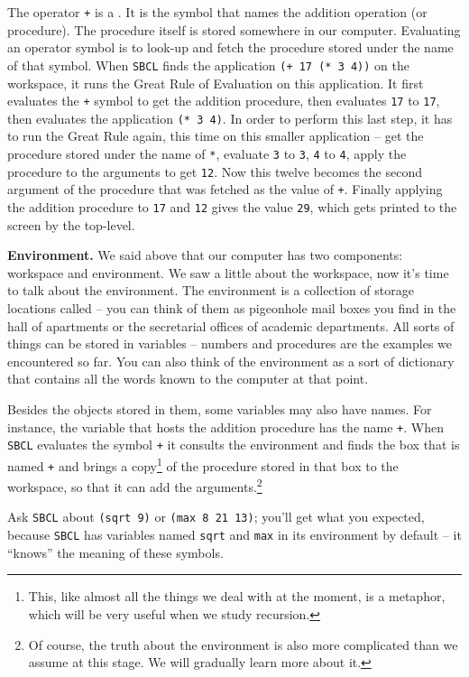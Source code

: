 \documentclass[a4paper,11pt]{article}
\begin{document}
\begin{uenum}
The operator \Verb-+- is a . It is the symbol that names the addition operation (or procedure). The procedure itself is stored somewhere in our computer. Evaluating an operator symbol is to look-up and fetch the procedure stored under the name of that symbol. When \Verb+SBCL+ finds the application \Verb-(+ 17 (* 3 4))- on the workspace, it runs the Great Rule of Evaluation on this application. It first evaluates the \Verb-+- symbol to get the addition procedure, then evaluates \Verb+17+ to \Verb+17+, then evaluates the application \Verb+(* 3 4)+. In order to perform this last step, it has to run the Great Rule again, this time on this smaller application -- get the procedure stored under the name of \Verb+*+, evaluate \Verb+3+ to \Verb+3+, \Verb+4+ to \Verb+4+, apply the procedure to the arguments to get \Verb+12+. Now this twelve becomes the second argument of the procedure that was fetched as the value of \Verb-+-. Finally applying the addition procedure to \Verb+17+ and \Verb+12+ gives the value \Verb+29+, which gets printed to the screen by the top-level.

\item {\bf Environment.} We said above that our computer has two components: workspace and environment. We saw a little about the workspace, now it's time to talk about the environment. The environment is a collection of storage locations called  -- you can think of them as pigeonhole mail boxes you find in the hall of apartments or the secretarial offices of academic departments. All sorts of things can be stored in variables -- numbers and procedures are the examples we encountered so far. You can also think of the environment as a sort of dictionary that contains all the words known to the computer at that point.

Besides the objects stored in them, some variables may also have names. For instance, the variable that hosts the addition procedure has the name \Verb-+-. When \Verb+SBCL+ evaluates the symbol \Verb-+- it consults the environment and finds the box that is named \Verb-+- and brings a copy\footnote{This, like almost all the things we deal with at the moment, is a metaphor, which will be very useful when we study recursion.} of the procedure stored in that box to the workspace, so that it can add the arguments.\footnote{Of course, the truth about the environment is also more complicated than we assume at this stage. We will gradually learn more about it.}

Ask \Verb+SBCL+ about \Verb+(sqrt 9)+ or \Verb+(max 8 21 13)+; you'll get what you expected, because \Verb+SBCL+ has variables named \Verb+sqrt+ and \Verb+max+ in its environment by default -- it ``knows'' the meaning of these symbols.


\end{uenum}
\end{document}
